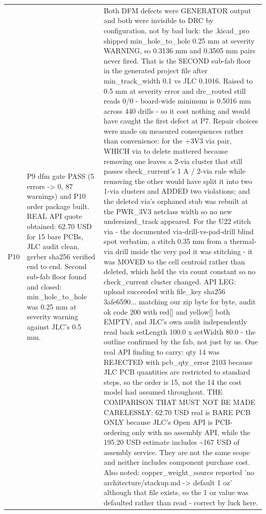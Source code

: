 \documentclass[11pt,a4paper]{article}
\begin{document}
{\begin{longtable}{lp{5.2cm}p{7.2cm}}
P10 & P9 dfm gate PASS (5 errors -\textgreater{} 0, 87 warnings) and P10 order package built. REAL API quote obtained: 62.70 USD for 15 bare PCBs, JLC audit clean, gerber sha256 verified end to end. Second sub-fab floor found and closed: min\_hole\_to\_hole was 0.25 mm at severity warning against JLC's 0.5 mm. & Both DFM defects were GENERATOR output and both were invisible to DRC by configuration, not by bad luck: the .kicad\_pro shipped min\_hole\_to\_hole 0.25 mm at severity WARNING, so 0.3136 mm and 0.3505 mm pairs never fired. That is the SECOND sub-fab floor in the generated project file after min\_track\_width 0.1 vs JLC 0.1016. Raised to 0.5 mm at severity error and drc\_routed still reads 0/0 - board-wide minimum is 0.5016 mm across 440 drills - so it cost nothing and would have caught the first defect at P7. Repair choices were made on measured consequences rather than convenience: for the +3V3 via pair, WHICH via to delete mattered because removing one leaves a 2-via cluster that still passes check\_current's 1 A / 2-via rule while removing the other would have split it into two 1-via clusters and ADDED two violations; and the deleted via's orphaned stub was rebuilt at the PWR\_3V3 netclass width so no new undersized\_track appeared. For the U22 stitch via - the documented via-drill-vs-pad-drill blind spot verbatim, a stitch 0.35 mm from a thermal-via drill inside the very pad it was stitching - it was MOVED to the cell centroid rather than deleted, which held the via count constant so no check\_current cluster changed. API LEG: upload succeeded with file\_key sha256 3afe6590... matching our zip byte for byte, audit ok code 200 with red{[}{]} and yellow{[}{]} both EMPTY, and JLC's own audit independently read back setLength 100.0 x setWidth 80.0 - the outline confirmed by the fab, not just by us. One real API finding to carry: qty 14 was REJECTED with pcb\_qty\_error 2103 because JLC PCB quantities are restricted to standard steps, so the order is 15, not the 14 the cost model had assumed throughout. THE COMPARISON THAT MUST NOT BE MADE CARELESSLY: 62.70 USD real is BARE PCB ONLY because JLC's Open API is PCB-ordering only with no assembly API, while the 195.20 USD estimate includes \textasciitilde{}167 USD of assembly service. They are not the same scope and neither includes component purchase cost. Also noted: copper\_weight\_source reported 'no architecture/stackup.md -\textgreater{} default 1 oz' although that file exists, so the 1 oz value was defaulted rather than read - correct by luck here. \\

\end{longtable}}
\end{document}
